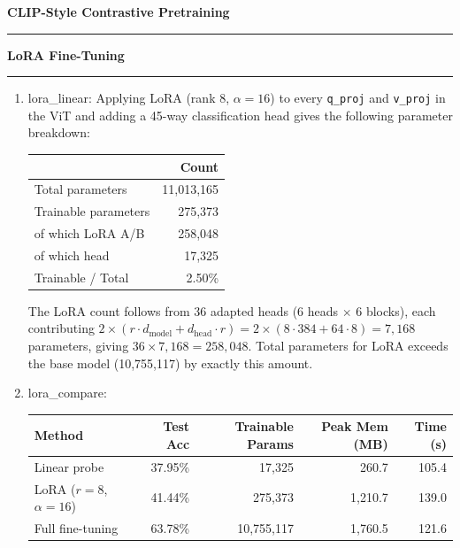 \documentclass[11pt]{article}
\newenvironment{question}[1]
    {
        \begin{center}
        \textbf{#1} \rmfamily
        \bigskip
        \hrule
    }
    {
        \end{center}
    }
\begin{document}
\begin{question}{CLIP-Style Contrastive Pretraining}
\begin{enumerate}[label=(\alph*)]
\end{enumerate}
\end{question}

\begin{question}{LoRA Fine-Tuning}
\begin{enumerate}[label=(\alph*)]

    \item lora\_linear: Applying LoRA (rank 8, $\alpha=16$) to every \texttt{q\_proj} and \texttt{v\_proj} in the ViT and adding a 45-way classification head gives the following parameter breakdown:

    \begin{center}
    \begin{tabular}{lr}
    \toprule
    & Count \\
    \midrule
    Total parameters         & 11,013,165 \\
    Trainable parameters     &    275,373 \\
    \quad of which LoRA A/B  &    258,048 \\
    \quad of which head      &     17,325 \\
    Trainable / Total        &      2.50\% \\
    \bottomrule
    \end{tabular}
    \end{center}

    The LoRA count follows from 36 adapted heads (6 heads $\times$ 6 blocks), each contributing $2 \times (r \cdot d_\text{model} + d_\text{head} \cdot r) = 2 \times (8 \cdot 384 + 64 \cdot 8) = 7{,}168$ parameters, giving $36 \times 7{,}168 = 258{,}048$. Total parameters for LoRA exceeds the base model (10,755,117) by exactly this amount.

    \item lora\_compare:

    \begin{center}
    \begin{tabular}{lrrrr}
    \toprule
    Method & Test Acc & Trainable Params & Peak Mem (MB) & Time (s) \\
    \midrule
    Linear probe              & 37.95\% &     17,325 &   260.7 & 105.4 \\
    LoRA ($r=8$, $\alpha=16$) & 41.44\% &    275,373 & 1,210.7 & 139.0 \\
    Full fine-tuning          & 63.78\% & 10,755,117 & 1,760.5 & 121.6 \\
    \bottomrule
    \end{tabular}
    \end{center}


\end{enumerate}
\end{question}
\end{document}
